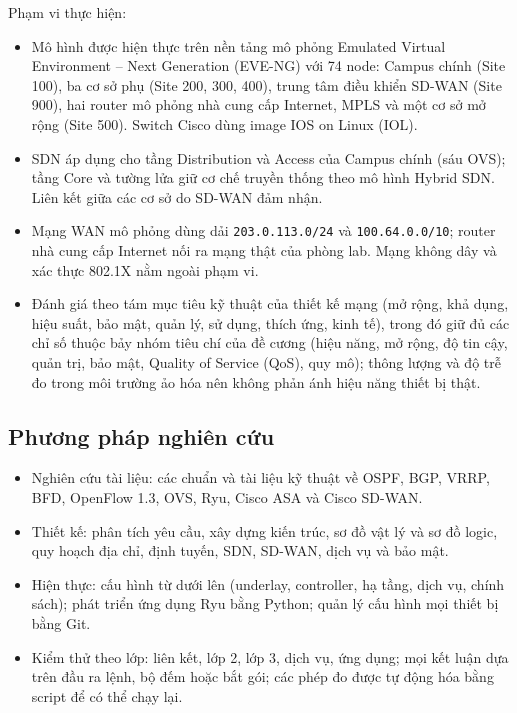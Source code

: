 Phạm vi thực hiện:
\begin{itemize}
    \item Mô hình được hiện thực trên nền tảng mô phỏng Emulated Virtual Environment -- Next Generation (EVE-NG) với 74 node: Campus chính (Site 100), ba cơ sở phụ (Site 200, 300, 400), trung tâm điều khiển SD-WAN (Site 900), hai router mô phỏng nhà cung cấp Internet, MPLS và một cơ sở mở rộng (Site 500). Switch Cisco dùng image IOS on Linux (IOL).
    \item SDN áp dụng cho tầng Distribution và Access của Campus chính (sáu OVS); tầng Core và tường lửa giữ cơ chế truyền thống theo mô hình Hybrid SDN. Liên kết giữa các cơ sở do SD-WAN đảm nhận.
    \item Mạng WAN mô phỏng dùng dải \texttt{203.0.113.0/24} và \texttt{100.64.0.0/10}; router nhà cung cấp Internet nối ra mạng thật của phòng lab. Mạng không dây và xác thực 802.1X nằm ngoài phạm vi.
    \item Đánh giá theo tám mục tiêu kỹ thuật của thiết kế mạng (mở rộng, khả dụng, hiệu suất, bảo mật, quản lý, sử dụng, thích ứng, kinh tế), trong đó giữ đủ các chỉ số thuộc bảy nhóm tiêu chí của đề cương (hiệu năng, mở rộng, độ tin cậy, quản trị, bảo mật, Quality of Service (QoS), quy mô); thông lượng và độ trễ đo trong môi trường ảo hóa nên không phản ánh hiệu năng thiết bị thật.
\end{itemize}

\subsection{Phương pháp nghiên cứu}

\begin{itemize}
    \item Nghiên cứu tài liệu: các chuẩn và tài liệu kỹ thuật về OSPF, BGP, VRRP, BFD, OpenFlow 1.3, OVS, Ryu, Cisco ASA và Cisco SD-WAN.
    \item Thiết kế: phân tích yêu cầu, xây dựng kiến trúc, sơ đồ vật lý và sơ đồ logic, quy hoạch địa chỉ, định tuyến, SDN, SD-WAN, dịch vụ và bảo mật.
    \item Hiện thực: cấu hình từ dưới lên (underlay, controller, hạ tầng, dịch vụ, chính sách); phát triển ứng dụng Ryu bằng Python; quản lý cấu hình mọi thiết bị bằng Git.
    \item Kiểm thử theo lớp: liên kết, lớp 2, lớp 3, dịch vụ, ứng dụng; mọi kết luận dựa trên đầu ra lệnh, bộ đếm hoặc bắt gói; các phép đo được tự động hóa bằng script để có thể chạy lại.
\end{itemize}

